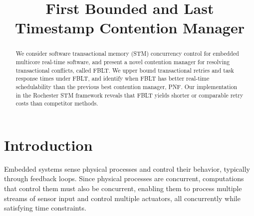 \documentclass[conference]{IEEEtran}
\begin{document}
%

\title{First Bounded and Last Timestamp Contention Manager}

\begin{comment}
\author{\IEEEauthorblockN{Mohammed Elshambakey}
\IEEEauthorblockA{ECE Dept, Virginia Tech\\
Blacksburg, VA 24060, USA\\
shambake@vt.edu}
\and
\IEEEauthorblockN{Binoy Ravindran}
\IEEEauthorblockA{ECE Dept, Virginia Tech\\
Blacksburg, VA 24060, USA\\
binoy@vt.edu}}
\end{comment}

\maketitle


\begin{abstract}
We consider software transactional memory (STM) concurrency control for embedded multicore real-time software, and present a novel contention manager for resolving transactional conflicts, called FBLT. We upper bound transactional retries and task response times under FBLT, and identify when FBLT has better real-time schedulability than the previous best contention manager, PNF. 
Our implementation in the Rochester STM framework reveals that FBLT yields shorter or comparable retry costs than competitor methods.
\end{abstract}


\IEEEpeerreviewmaketitle


\section{Introduction}

\label{sec:intro}

Embedded systems sense physical processes and control their behavior, typically through feedback loops. Since physical processes are concurrent, computations that control them must also be concurrent, enabling them to process multiple streams of sensor input and control multiple actuators, all concurrently while satisfying time constraints. 
\end{document}
